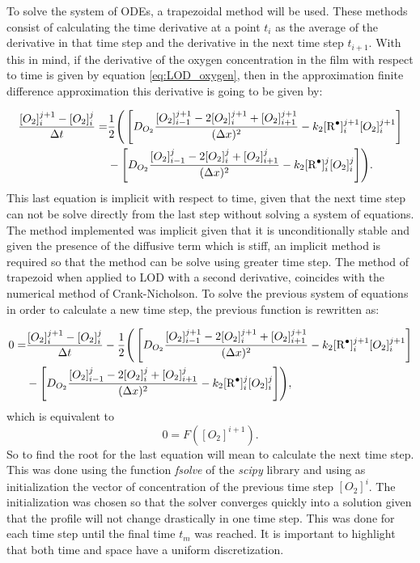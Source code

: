 \begin{refsection}
To solve the system of ODEs, a trapezoidal method will be used. These methods consist of calculating the time derivative at a point $t_i$ as the average of the derivative in that time step and the derivative in the next time step $t_{i+1}$. With this in mind, if the derivative of the oxygen concentration in the film with respect to time is given by equation \ref{eq:LOD_oxygen}, then in the approximation finite difference approximation this derivative is going to be given by:

\begin{align}
    \frac{[O_2]^{j+1}_i-[O_2]^j_i}{\Delta t}=&\frac{1}{2}\Biggr(\left[ D_{O_2} \frac{[O_2]_{i-1}^{j+1}-2[O_2]_{i}^{j+1}+[O_2]_{i+1}^{j+1}}{(\Delta x)^2}-k_2[\ce{R^.}]_i^{j+1}[O_2]_i^{j+1}\right] \nonumber\\
    &-\left[D_{O_2}\frac{[O_2]_{i-1}^{j}-2[O_2]_{i}^{j}+[O_2]_{i+1}^{j}}{(\Delta x)^2}-k_2[\ce{R^.}]_i^{j}[O_2]_i^{j}\right]\Biggr).
\end{align}
This last equation is implicit with respect to time, given that the next time step can not be solve directly from the last step without solving a system of equations. The method implemented was implicit given that it is unconditionally stable and given the presence of the diffusive term which is stiff, an implicit method is required so that the method can be solve using greater time step.  The method of trapezoid when applied to LOD with a second derivative, coincides with the numerical method of Crank-Nicholson. To solve the previous system of equations in order to calculate a new time step, the previous function is rewritten as:

\begin{align}
    0=&\frac{[O_2]^{j+1}_i-[O_2]^j_i}{\Delta t}-\frac{1}{2}\Biggr(\left[ D_{O_2} \frac{[O_2]_{i-1}^{j+1}-2[O_2]_{i}^{j+1}+[O_2]_{i+1}^{j+1}}{(\Delta x)^2}-k_2[\ce{R^.}]_i^{j+1}[O_2]_i^{j+1}\right] \nonumber\\
    &-\left[D_{O_2}\frac{[O_2]_{i-1}^{j}-2[O_2]_{i}^{j}+[O_2]_{i+1}^{j}}{(\Delta x)^2}-k_2[\ce{R^.}]_i^{j}[O_2]_i^{j}\right]\Biggr),
\end{align}
which is equivalent to 
\begin{equation}
    0=F([O_2]^{i+1}). 
\end{equation}
So to find the root for the last equation will mean to calculate the next time step. This was done using the function \textit{fsolve} of the \textit{scipy} library and using as initialization the vector of concentration of the previous time step $[O_2]^{i}$. The initialization was chosen so that the solver converges quickly into a solution given that the profile will not change drastically in one time step. This was done for each time step until the final time $t_m$ was reached. It is important to highlight that both time and space have a uniform discretization. 


\end{refsection}
